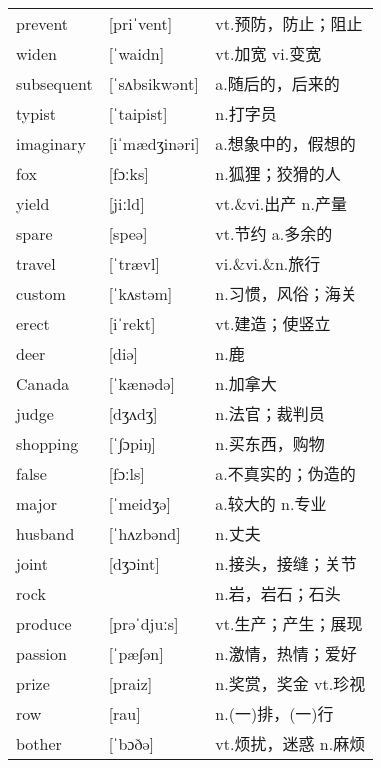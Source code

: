\documentclass[a4paper]{article}
\begin{document}
\section{}
\begin{tabular}{l l l}

prevent & [priˈvent] & vt.预防，防止；阻止 \\
widen & [ˈwaidn] & vt.加宽 vi.变宽 \\
subsequent & [ˈsʌbsikwənt] & a.随后的，后来的 \\
typist & [ˈtaipist] & n.打字员 \\
imaginary & [iˈmædʒinəri] & a.想象中的，假想的 \\
fox & [fɔːks] & n.狐狸；狡猾的人 \\
yield & [jiːld] & vt.\&vi.出产 n.产量 \\
spare & [speə] & vt.节约 a.多余的 \\
travel & [ˈtrævl] & vi.\&vi.\&n.旅行 \\
custom & [ˈkʌstəm] & n.习惯，风俗；海关 \\
erect & [iˈrekt] & vt.建造；使竖立 \\
deer & [diə] & n.鹿 \\
Canada & [ˈkænədə] & n.加拿大 \\
judge & [dʒʌdʒ] & n.法官；裁判员 \\
shopping & [ˈ∫ɔpiŋ] & n.买东西，购物 \\
false & [fɔːls] & a.不真实的；伪造的 \\
major & [ˈmeidʒə] & a.较大的 n.专业 \\
husband & [ˈhʌzbənd] & n.丈夫 \\
joint & [dʒɔint] & n.接头，接缝；关节 \\
rock &  & n.岩，岩石；石头 \\
produce & [prəˈdjuːs] & vt.生产；产生；展现 \\
passion & [ˈpæ∫ən] & n.激情，热情；爱好 \\
prize & [praiz] & n.奖赏，奖金 vt.珍视 \\
row & [rau] & n.(一)排，(一)行 \\
bother & [ˈbɔðə] & vt.烦扰，迷惑 n.麻烦 \\

\end{tabular}
\end{document}
